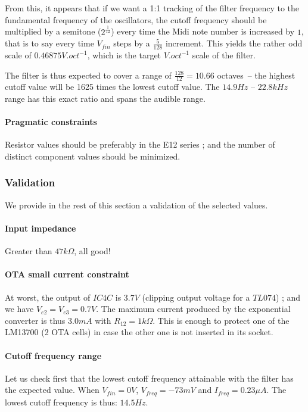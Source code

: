 \documentclass[a4paper,11pt]{article}
\begin{document}
From this, it appears that if we want a 1:1 tracking of the filter frequency to the fundamental frequency of the oscillators, the cutoff frequency should be multiplied by a semitone ($2^\frac{1}{12}$) every time the Midi note number is increased by $1$, that is to say every time $V_{fin}$ steps by a $\frac{5}{128}$ increment. This yields the rather odd scale of $0.46875V.oct^{-1}$, which is the target $V.oct^{-1}$ scale of the filter.

The filter is thus expected to cover a range of $\frac{128}{12} = 10.66$ octaves~-- the highest cutoff value will be 1625 times the lowest cutoff value. The $14.9 Hz$ -- $22.8kHz$ range has this exact ratio and spans the audible range.

\paragraph{Pragmatic constraints} Resistor values should be preferably in the E12 series ; and the number of distinct component values should be minimized.

\subsubsection{Validation}

We provide in the rest of this section a validation of the selected values.

\paragraph{Input impedance} Greater than $47k\Omega$, all good!

\paragraph{OTA small current constraint} At worst, the output of $IC4C$ is $3.7V$ (clipping output voltage for a $TL074$) ; and we have $V_{e2} = V_{e3} = 0.7V$. The maximum current produced by the exponential converter is thus $3.0mA$ with $R_{12} = 1k\Omega$. This is enough to protect one of the LM13700 (2 OTA cells) in case the other one is not inserted in its socket.

\paragraph{Cutoff frequency range} Let us check first that the lowest cutoff frequency attainable with the filter has the expected value. When $V_{fin} = 0V$, $V_{freq} = -73mV$ and $I_{freq} = 0.23\mu A$. The lowest cutoff frequency is thus: $14.5 Hz$.
\end{document}
